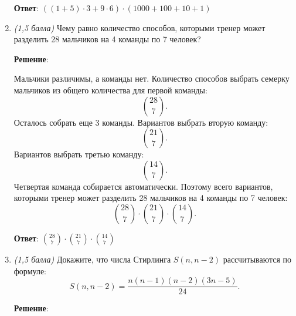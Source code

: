 \documentclass{article}
\begin{document}
\begin{enumerate}
    \textbf{Ответ}:
    $((1 + 5) \cdot 3 + 9 \cdot 6) \cdot (1000 + 100 + 10 + 1)$

    
    \item \textit{(1,5 балла)} Чему равно количество способов, которыми тренер может разделить 28 мальчиков на 4 команды по 7 человек?
    
    \textbf{Решение}:

    Мальчики различимы, а команды нет. Количество способов выбрать семерку мальчиков из общего количества для первой команды:
    \begin{equation}
        \binom{28}{7}.
    \end{equation}
    Осталось собрать еще 3 команды. Вариантов выбрать вторую команду:
    \begin{equation}
        \binom{21}{7}.
    \end{equation}
    Вариантов выбрать третью команду:
    \begin{equation}
        \binom{14}{7}.
    \end{equation}
    Четвертая команда собирается автоматически. Поэтому всего вариантов, которыми тренер может разделить 28 мальчиков на 4 команды по 7 человек:
    \begin{equation}
        \binom{28}{7} \cdot \binom{21}{7} \cdot \binom{14}{7}.
    \end{equation}

    \textbf{Ответ}:
    $\binom{28}{7} \cdot \binom{21}{7} \cdot \binom{14}{7}$
   
    \item \textit{(1,5 балла)} Докажите, что числа Стирлинга $S(n,n-2)$ рассчитываются по формуле:
    $$S(n,n-2)=\frac{n(n-1)(n-2)(3n-5)}{24}.$$

    \textbf{Решение}:


\end{enumerate}
\end{document}
